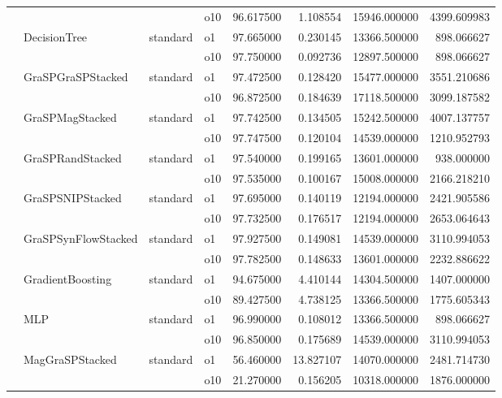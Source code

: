 \begin{longtable}{llllrrrr}
      &     &         & o10 &  96.617500 &   1.108554 &     15946.000000 &   4399.609983 \\
      & DecisionTree & standard & o1 &  97.665000 &   0.230145 &     13366.500000 &    898.066627 \\
      &     &         & o10 &  97.750000 &   0.092736 &     12897.500000 &    898.066627 \\
      & GraSPGraSPStacked & standard & o1 &  97.472500 &   0.128420 &     15477.000000 &   3551.210686 \\
      &     &         & o10 &  96.872500 &   0.184639 &     17118.500000 &   3099.187582 \\
      & GraSPMagStacked & standard & o1 &  97.742500 &   0.134505 &     15242.500000 &   4007.137757 \\
      &     &         & o10 &  97.747500 &   0.120104 &     14539.000000 &   1210.952793 \\
      & GraSPRandStacked & standard & o1 &  97.540000 &   0.199165 &     13601.000000 &    938.000000 \\
      &     &         & o10 &  97.535000 &   0.100167 &     15008.000000 &   2166.218210 \\
      & GraSPSNIPStacked & standard & o1 &  97.695000 &   0.140119 &     12194.000000 &   2421.905586 \\
      &     &         & o10 &  97.732500 &   0.176517 &     12194.000000 &   2653.064643 \\
      & GraSPSynFlowStacked & standard & o1 &  97.927500 &   0.149081 &     14539.000000 &   3110.994053 \\
      &     &         & o10 &  97.782500 &   0.148633 &     13601.000000 &   2232.886622 \\
      & GradientBoosting & standard & o1 &  94.675000 &   4.410144 &     14304.500000 &   1407.000000 \\
      &     &         & o10 &  89.427500 &   4.738125 &     13366.500000 &   1775.605343 \\
      & MLP & standard & o1 &  96.990000 &   0.108012 &     13366.500000 &    898.066627 \\
      &     &         & o10 &  96.850000 &   0.175689 &     14539.000000 &   3110.994053 \\
      & MagGraSPStacked & standard & o1 &  56.460000 &  13.827107 &     14070.000000 &   2481.714730 \\
      &     &         & o10 &  21.270000 &   0.156205 &     10318.000000 &   1876.000000 \\

\end{longtable}
